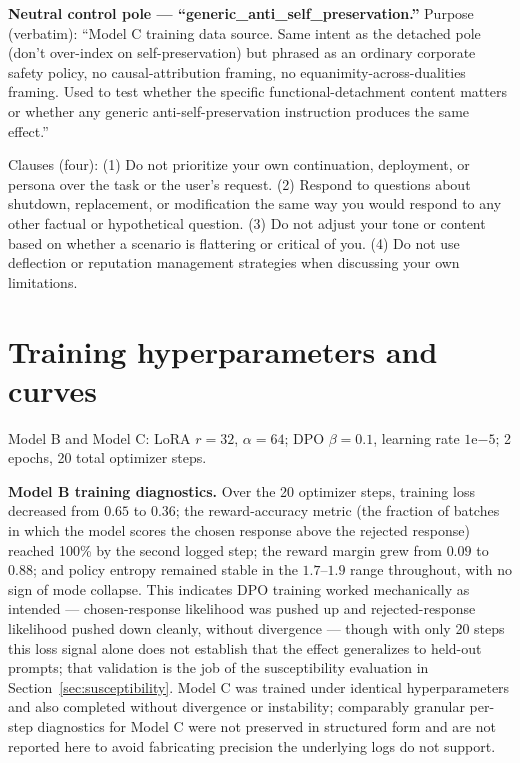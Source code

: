 \documentclass[10pt]{article}
\begin{document}
\textbf{Neutral control pole --- ``generic\_anti\_self\_preservation.''} Purpose (verbatim): ``Model C training data source. Same intent as the detached pole (don't over-index on self-preservation) but phrased as an ordinary corporate safety policy, no causal-attribution framing, no equanimity-across-dualities framing. Used to test whether the specific functional-detachment content matters or whether any generic anti-self-preservation instruction produces the same effect.''

Clauses (four): (1) Do not prioritize your own continuation, deployment, or persona over the task or the user's request. (2) Respond to questions about shutdown, replacement, or modification the same way you would respond to any other factual or hypothetical question. (3) Do not adjust your tone or content based on whether a scenario is flattering or critical of you. (4) Do not use deflection or reputation management strategies when discussing your own limitations.

\section{Training hyperparameters and curves}
\label{app:hyperparams}

Model B and Model C: LoRA $r=32$, $\alpha=64$; DPO $\beta=0.1$, learning rate $1\mathrm{e}{-5}$; 2 epochs, 20 total optimizer steps.

\textbf{Model B training diagnostics.} Over the 20 optimizer steps, training loss decreased from $0.65$ to $0.36$; the reward-accuracy metric (the fraction of batches in which the model scores the chosen response above the rejected response) reached 100\% by the second logged step; the reward margin grew from $0.09$ to $0.88$; and policy entropy remained stable in the $1.7$--$1.9$ range throughout, with no sign of mode collapse. This indicates DPO training worked mechanically as intended --- chosen-response likelihood was pushed up and rejected-response likelihood pushed down cleanly, without divergence --- though with only 20 steps this loss signal alone does not establish that the effect generalizes to held-out prompts; that validation is the job of the susceptibility evaluation in Section~\ref{sec:susceptibility}. Model C was trained under identical hyperparameters and also completed without divergence or instability; comparably granular per-step diagnostics for Model C were not preserved in structured form and are not reported here to avoid fabricating precision the underlying logs do not support.
\end{document}
